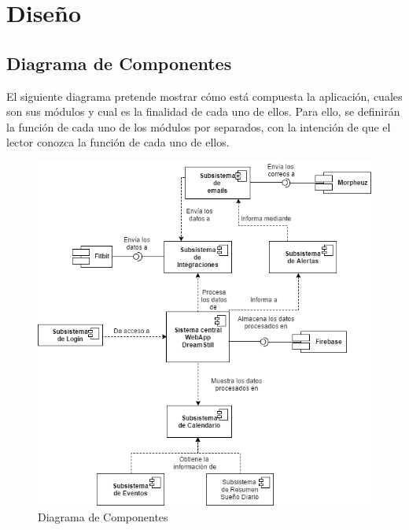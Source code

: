 \documentclass[11pt,openany]{book}
\begin{document}
\section{Diseño}

\subsection{Diagrama de Componentes}
 
 El siguiente diagrama pretende mostrar cómo está compuesta la aplicación, cuales son sus módulos y cual es la finalidad de cada uno de ellos. Para ello, se definirán la función de cada uno de los módulos por separados, con la intención de que el lector conozca la función de cada uno de ellos.
 
\begin{figure}[H]
\centering
\includegraphics[totalheight=10cm]{diagramas/Diagrama_de_Componentes.png}
\caption{Diagrama de Componentes}
\end{figure}
\end{document}
